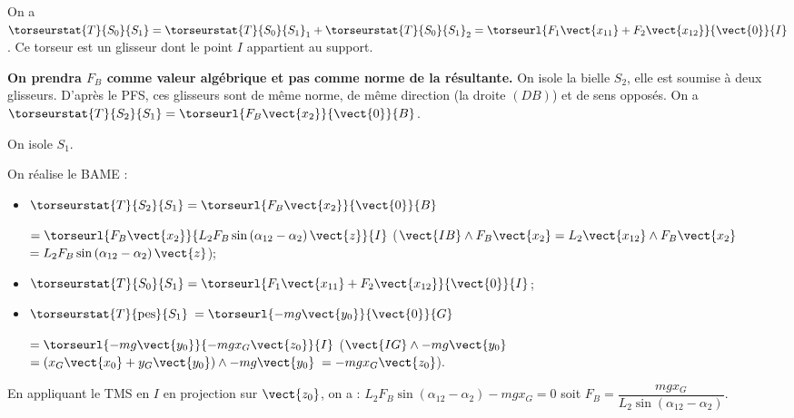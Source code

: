 \ifnormal
{}
\else
\fi

\ifprof
\begin{corrige}
On a $\torseurstat{T}{S_0}{S_1}=\torseurstat{T}{S_0}{S_1}_1+\torseurstat{T}{S_0}{S_1}_2=\torseurl{F_1\vect{x_{11}}+F_2\vect{x_{12}}}{\vect{0}}{I}$. Ce torseur est un glisseur dont le point $I$ appartient au support. 
\end{corrige}
\else
\fi

\ifnormal
{}
\else
\fi


\ifprof
\begin{corrige}
\textbf{On prendra $F_B$ comme valeur algébrique et pas comme norme de la résultante.}
On isole la bielle $S_2$, elle est soumise à deux glisseurs. D'après le PFS, ces glisseurs sont de même norme, de même direction  (la droite $(DB)$) et de sens opposés. 
On a $\torseurstat{T}{S_2}{S_1}=\torseurl{ F_B\vect{x_{2}}}{\vect{0}}{B}$.
\end{corrige}
\else
\fi


\ifnormal
{}
\else
\fi

\ifprof
\begin{corrige}
On isole $S_1$. 

On réalise le BAME : 
\begin{itemize}
\item $\torseurstat{T}{S_2}{S_1}=\torseurl{ F_B\vect{x_{2}}}{\vect{0}}{B}$ 

$=\torseurl{ F_B\vect{x_{2}}}{L_2 F_B \sin  \left(\alpha_{12}-\alpha_2\right) \vect{z}}{I}$ ($\vect{IB}\wedge F_B\vect{x_{2}}=L_2\vect{x_{12}}\wedge  F_B\vect{x_{2}}$ $=L_2 F_B \sin  \left(\alpha_{12}-\alpha_2\right) \vect{z}$);
\item $\torseurstat{T}{S_0}{S_1}=\torseurl{F_1\vect{x_{11}}+F_2\vect{x_{12}}}{\vect{0}}{I}$;
\item $\torseurstat{T}{ \text{pes} }{S_1}$ $=\torseurl{-mg \vect{y_{0}}}{\vect{0}}{G}$

$=\torseurl{-mg \vect{y_{0}}}{-mgx_G\vect{z_{0}}}{I}$ ($\vect{IG}\wedge -mg \vect{y_{0}}$ $=\left(x_G\vect{x_{0}}+y_G\vect{y_{0}} \right) \wedge  -mg \vect{y_{0}}$ $= -mgx_G\vect{z_{0}}$).
\end{itemize}

En appliquant le TMS en $I$ en projection sur $\vect{z_0}$, on a : 
$L_2 F_B \sin  \left(\alpha_{12}-\alpha_2\right)  -mgx_G = 0 $ soit
$ F_B    = \dfrac{mgx_G}{L_2  \sin  \left(\alpha_{12}-\alpha_2\right)} $. 
\end{corrige}
\else
\fi

